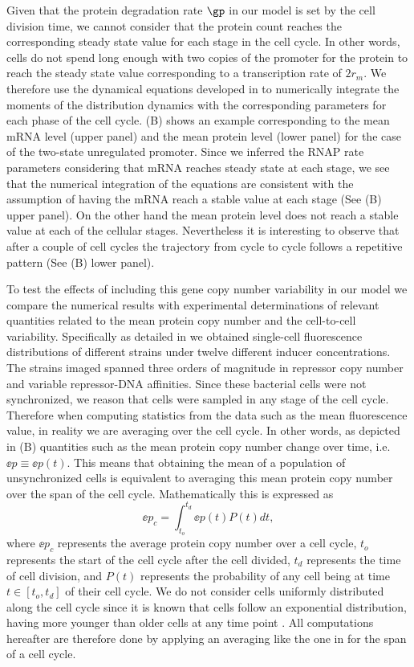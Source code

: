 Given that the protein degradation rate $\gp$ in our model is set by the cell
division time, we cannot consider that the protein count reaches the
corresponding steady state value for each stage in the cell cycle. In other
words, cells do not spend long enough with two copies of the promoter for the
protein to reach the steady state value corresponding to a transcription rate of
$2 r_m$. We therefore use the dynamical equations developed in
 to numerically integrate the moments of the distribution
dynamics with the corresponding parameters for each phase of the cell cycle.
(B) shows an example corresponding to the mean mRNA level
(upper panel) and the mean protein level (lower panel) for the case of the
two-state unregulated promoter. Since we inferred the RNAP rate parameters
considering that mRNA reaches steady state at each stage, we see that the
numerical integration of the equations are consistent with the assumption of
having the mRNA reach a stable value at each stage (See
(B) upper panel). On the other hand the mean protein level
does not reach a stable value at each of the cellular stages. Nevertheless it is
interesting to observe that after a couple of cell cycles the trajectory from
cycle to cycle follows a repetitive pattern (See (B) lower
panel).

To test the effects of including this gene copy number variability in our
model we compare the numerical results with experimental determinations of
relevant quantities related to the mean protein copy number and the cell-to-cell
variability. Specifically as detailed in  we obtained single-cell
fluorescence distributions of different strains under twelve different inducer
concentrations. The strains imaged spanned three orders of magnitude in
repressor copy number and variable repressor-DNA affinities. Since these
bacterial cells were not synchronized, we reason that cells were sampled in any
stage of the cell cycle. Therefore when computing statistics from the data such
as the mean fluorescence value, in reality we are averaging over the cell
cycle. In other words, as depicted in (B) quantities such
as the mean protein copy number change over time, i.e. $\ee{p} \equiv
\ee{p(t)}$. This means that obtaining the mean of a population of unsynchronized
cells is equivalent to averaging this mean protein copy number over the span of
the cell cycle. Mathematically this is expressed as
\begin{equation}
	\ee{p}_c = \int_{t_o}^{t_d} \ee{p(t)} P(t) dt,
	\label{eq_time_avg}
\end{equation}
where $\ee{p}_c$ represents the average protein copy number over a cell cycle,
$t_o$ represents the start of the cell cycle after the cell divided, $t_d$
represents the time of cell division, and $P(t)$ represents the probability of
any cell being at time $t \in [t_o, t_d]$ of their cell cycle. We do not
consider cells uniformly distributed along the cell cycle since it is known that
cells follow an exponential distribution, having more younger than older cells
at any time point \cite{Powell1956}. All computations hereafter are therefore
done by applying an averaging like the one in  for the span
of a cell cycle.

